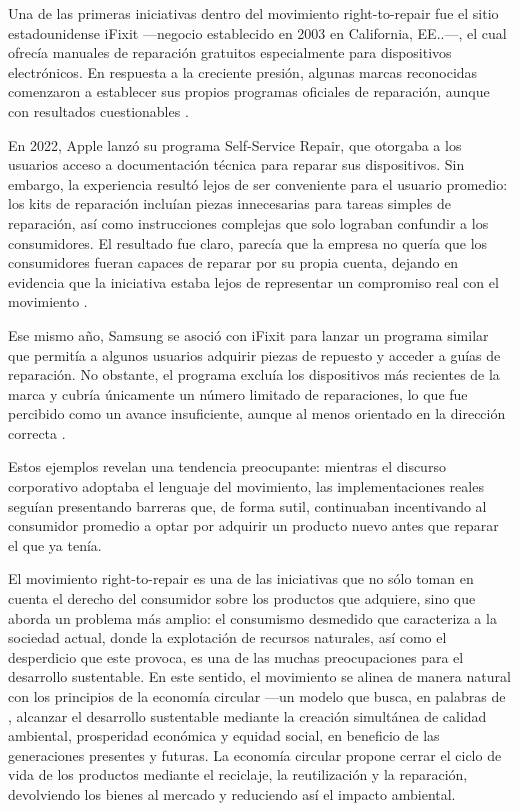 Una de las primeras iniciativas dentro del movimiento right-to-repair fue el
sitio estadounidense iFixit —negocio establecido en 2003 en California,
EE.\@UU.—, el cual ofrecía manuales de reparación gratuitos especialmente para
dispositivos electrónicos. En respuesta a la creciente presión, algunas marcas
reconocidas comenzaron a establecer sus propios programas oficiales de
reparación, aunque con resultados cuestionables
\parencite[p.~220]{ozturkcan2023}.  

En 2022, Apple lanzó su programa Self-Service Repair, que otorgaba a los
usuarios acceso a documentación técnica para reparar sus dispositivos. Sin
embargo, la experiencia resultó lejos de ser conveniente para el usuario
promedio: los kits de reparación incluían piezas innecesarias para tareas
simples de reparación, así como instrucciones complejas que solo lograban
confundir a los consumidores. El resultado fue claro, parecía que la empresa no
quería que los consumidores fueran capaces de reparar por su propia cuenta,
dejando en evidencia que la iniciativa estaba lejos de representar un compromiso
real con el movimiento \parencite[p.~221]{ozturkcan2023}.

Ese mismo año, Samsung se asoció con iFixit para lanzar un programa similar que
permitía a algunos usuarios adquirir piezas de repuesto y acceder a guías de
reparación. No obstante, el programa excluía los dispositivos más recientes de
la marca y cubría únicamente un número limitado de reparaciones, lo que fue
percibido como un avance insuficiente, aunque al menos orientado en la dirección
correcta \parencite[p.~221]{ozturkcan2023}.

Estos ejemplos revelan una tendencia preocupante: mientras el discurso
corporativo adoptaba el lenguaje del movimiento, las implementaciones reales
seguían presentando barreras que, de forma sutil, continuaban incentivando al
consumidor promedio a optar por adquirir un producto nuevo antes que reparar el
que ya tenía. 

El movimiento right-to-repair es una de las iniciativas que no sólo toman en
cuenta el derecho del consumidor sobre los productos que adquiere, sino que
aborda un problema más amplio: el consumismo desmedido que caracteriza a la
sociedad actual, donde la explotación de recursos naturales, así como el
desperdicio que este provoca, es una de las muchas preocupaciones para el
desarrollo sustentable. En este sentido, el movimiento se alinea de manera
natural con los principios de la economía circular —un modelo que busca, en
palabras de \textcite[p.~229]{kirchherr2017}, alcanzar el desarrollo sustentable
mediante la creación simultánea de calidad ambiental, prosperidad económica y
equidad social, en beneficio de las generaciones presentes y futuras. La
economía circular propone cerrar el ciclo de vida de los productos mediante el
reciclaje, la reutilización y la reparación, devolviendo los bienes al mercado y
reduciendo así el impacto ambiental. 

